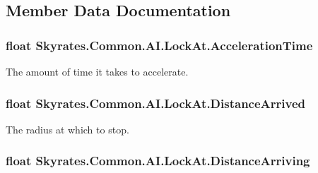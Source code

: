 \subsection{Member Data Documentation}
\hypertarget{class_skyrates_1_1_common_1_1_a_i_1_1_lock_at_a84bc49177ac0a08e7209e17e434b39c8}{
\subsubsection[{Acceleration\-Time}]{\setlength{\rightskip}{0pt plus 5cm}float Skyrates.\-Common.\-A\-I.\-Lock\-At.\-Acceleration\-Time}}\label{class_skyrates_1_1_common_1_1_a_i_1_1_lock_at_a84bc49177ac0a08e7209e17e434b39c8}


The amount of time it takes to accelerate. 

\hypertarget{class_skyrates_1_1_common_1_1_a_i_1_1_lock_at_a8070453746e68b006a34fc2d31f20141}{
\subsubsection[{Distance\-Arrived}]{\setlength{\rightskip}{0pt plus 5cm}float Skyrates.\-Common.\-A\-I.\-Lock\-At.\-Distance\-Arrived}}\label{class_skyrates_1_1_common_1_1_a_i_1_1_lock_at_a8070453746e68b006a34fc2d31f20141}


The radius at which to stop. 

\hypertarget{class_skyrates_1_1_common_1_1_a_i_1_1_lock_at_aa2598242366a394957fab66e2231a204}{
\subsubsection[{Distance\-Arriving}]{\setlength{\rightskip}{0pt plus 5cm}float Skyrates.\-Common.\-A\-I.\-Lock\-At.\-Distance\-Arriving}}\label{class_skyrates_1_1_common_1_1_a_i_1_1_lock_at_aa2598242366a394957fab66e2231a204}


